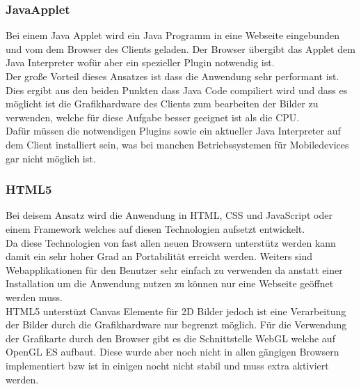 \subsubsection{JavaApplet}
\label{sec:JavaApplet}
Bei einem Java Applet wird ein Java Programm in eine Webseite eingebunden und vom dem Browser des Clients geladen.
Der Browser übergibt das Applet dem Java Interpreter wofür aber ein spezieller Plugin notwendig ist.
\\
Der große Vorteil dieses Ansatzes ist dass die Anwendung sehr performant ist.
Dies ergibt aus den beiden Punkten dass Java Code compiliert wird und dass es möglicht ist die Grafikhardware des Clients zum bearbeiten der Bilder zu verwenden,
welche für diese Aufgabe besser geeignet ist als die CPU.
\\
Dafür müssen die notwendigen Plugins sowie ein aktueller Java Interpreter auf dem Client installiert sein, 
was bei manchen Betriebssystemen für Mobiledevices gar nicht möglich ist.
\cite{japp}

\subsubsection{HTML5}
\label{sec:HTML5}
Bei deisem Ansatz wird die Anwendung in HTML, CSS und JavaScript oder einem Framework welches auf diesen Technologien aufsetzt entwickelt.
\\
Da diese Technologien von fast allen neuen Browsern unterstütz werden kann damit ein sehr hoher Grad an Portabilität erreicht werden.
Weiters sind Webapplikationen für den Benutzer sehr einfach zu verwenden da anstatt einer Installation um die Anwendung nutzen zu können nur eine Webseite geöffnet werden muss.
\cite{html-14}
\\
HTML5 unterstüzt Canvas Elemente für 2D Bilder jedoch ist eine Verarbeitung der Bilder durch die Grafikhardware nur begrenzt möglich.
Für die Verwendung der Grafikarte durch den Browser gibt es die Schnittstelle WebGL welche auf OpenGL ES aufbaut.
Diese wurde aber noch nicht in allen gängigen Browsern implementiert bzw ist in einigen nocht nicht stabil und muss extra aktiviert werden.
\cite{webgl-14}


